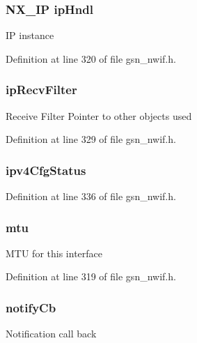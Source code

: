 \hypertarget{a00167_a930e1578ead182fd8ff6cd8f8540a54c}{
\subsubsection[{ipHndl}]{\setlength{\rightskip}{0pt plus 5cm}NX\_\-IP {\bf ipHndl}}}
\label{a00167_a930e1578ead182fd8ff6cd8f8540a54c}
IP instance 

Definition at line 320 of file gsn\_\-nwif.h.

\hypertarget{a00167_ab32f7d6fb4fbd0d87bb049ea5f1e07fa}{
\subsubsection[{ipRecvFilter}]{ {\bf ipRecvFilter}}}
\label{a00167_ab32f7d6fb4fbd0d87bb049ea5f1e07fa}
Receive Filter Pointer to other objects used 

Definition at line 329 of file gsn\_\-nwif.h.

\hypertarget{a00167_a2a6b0e4974e54ca63107a333a43ecf0f}{
\subsubsection[{ipv4CfgStatus}]{ {\bf ipv4CfgStatus}}}
\label{a00167_a2a6b0e4974e54ca63107a333a43ecf0f}


Definition at line 336 of file gsn\_\-nwif.h.

\hypertarget{a00167_a29e099f0875d30b6a75ee68c747dde11}{
\subsubsection[{mtu}]{ {\bf mtu}}}
\label{a00167_a29e099f0875d30b6a75ee68c747dde11}
MTU for this interface 

Definition at line 319 of file gsn\_\-nwif.h.

\hypertarget{a00167_a4ca5a13e12b232c651f00a734c0d327a}{
\subsubsection[{notifyCb}]{ {\bf notifyCb}}}
\label{a00167_a4ca5a13e12b232c651f00a734c0d327a}
Notification call back 

